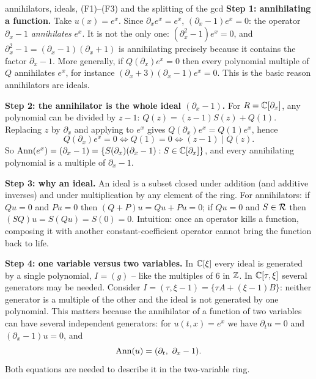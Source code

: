 \begin{explained}{annihilators, ideals, (F1)--(F3) and the splitting of the gcd}
\textbf{Step 1: annihilating a function.} Take $u(x)=e^{x}$. Since $\partial_xe^x=e^x$, $(\partial_x-1)e^x=0$: the operator $\partial_x-1$ \emph{annihilates} $e^x$. It is not the only one: $(\partial_x^2-1)e^x=0$, and $\partial_x^2-1=(\partial_x-1)(\partial_x+1)$ is annihilating precisely because it contains the factor $\partial_x-1$. More generally, if $Q(\partial_x)e^x=0$ then every polynomial multiple of $Q$ annihilates $e^x$, for instance $(\partial_x+3)(\partial_x-1)e^x=0$. This is the basic reason annihilators are ideals.

\medskip\textbf{Step 2: the annihilator is the whole ideal $(\partial_x-1)$.} For $R=\mathbb{C}[\partial_x]$, any polynomial can be divided by $z-1$: $Q(z)=(z-1)S(z)+Q(1)$. Replacing $z$ by $\partial_x$ and applying to $e^x$ gives $Q(\partial_x)e^x=Q(1)e^x$, hence
\[
Q(\partial_x)e^x=0\iff Q(1)=0\iff(z-1)\mid Q(z).
\]
So $\operatorname{Ann}(e^x)=(\partial_x-1)=\{S(\partial_x)(\partial_x-1):S\in\mathbb{C}[\partial_x]\}$, and every annihilating polynomial is a multiple of $\partial_x-1$.

\medskip\textbf{Step 3: why an ideal.} An ideal is a subset closed under addition (and additive inverses) and under multiplication by any element of the ring. For annihilators: if $Qu=0$ and $Pu=0$ then $(Q+P)u=Qu+Pu=0$; if $Qu=0$ and $S\in\mathcal{R}$ then $(SQ)u=S(Qu)=S(0)=0$. Intuition: once an operator kills a function, composing it with another constant-coefficient operator cannot bring the function back to life.

\medskip\textbf{Step 4: one variable versus two variables.} In $\mathbb{C}[\xi]$ every ideal is generated by a single polynomial, $I=(g)$ -- like the multiples of $6$ in $\mathbb{Z}$. In $\mathbb{C}[\tau,\xi]$ several generators may be needed. Consider $I=(\tau,\xi-1)=\{\tau A+(\xi-1)B\}$: neither generator is a multiple of the other and the ideal is not generated by one polynomial. This matters because the annihilator of a function of two variables can have several independent generators: for $u(t,x)=e^x$ we have $\partial_tu=0$ and $(\partial_x-1)u=0$, and
\[
\Ann(u)=(\partial_t,\ \partial_x-1).
\]
Both equations are needed to describe it in the two-variable ring.


\end{explained}
